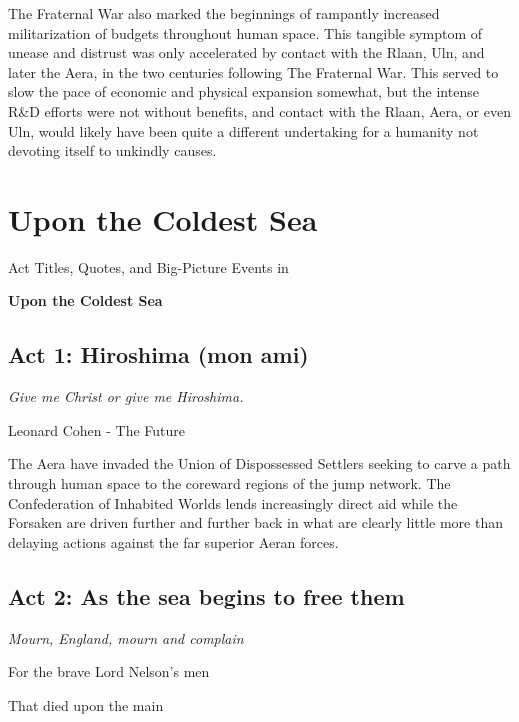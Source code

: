 The Fraternal War also marked the beginnings of rampantly increased
militarization of budgets throughout human space. This tangible
symptom of unease and distrust was only accelerated by contact with
the Rlaan, Uln, and later the Aera, in the two centuries following The
Fraternal War. This served to slow the pace of economic and physical
expansion somewhat, but the intense R\&D efforts were not without
benefits, and contact with the Rlaan, Aera, or even Uln, would likely
have been quite a different undertaking for a humanity not devoting
itself to unkindly causes.

\section{Upon the Coldest Sea}
\label{exptimeline:UtCS}
Act Titles, Quotes, and Big-Picture Events in

{\bf Upon the Coldest Sea }

\subsection{Act 1: Hiroshima (mon ami)}
\begin{center}
{\it Give me Christ or give me Hiroshima.}

Leonard Cohen - The Future
\end{center}

The Aera have invaded the Union of Dispossessed Settlers seeking to
carve a path through human space to the coreward regions of the jump
network. The Confederation of Inhabited Worlds lends increasingly
direct aid while the Forsaken are driven further and further back in
what are clearly little more than delaying actions against the far
superior Aeran forces.

\subsection{Act 2: As the sea begins to free them}

\begin{center}
{\it Mourn, England, mourn and complain

For the brave Lord Nelson's men

That died upon the main}
\end{center}


